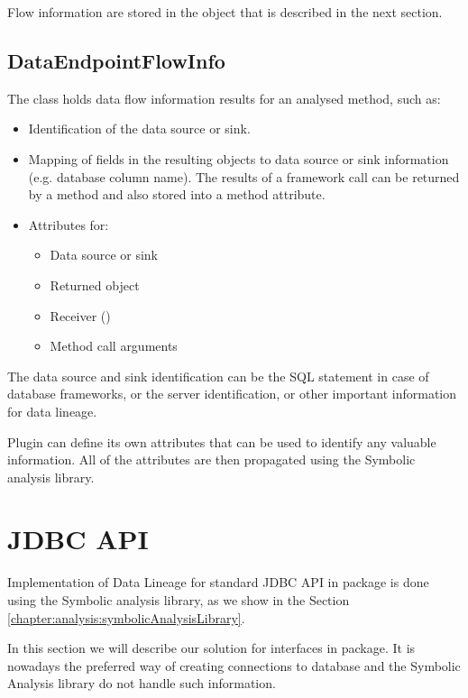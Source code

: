 Flow information are stored in the  object that
is described in the next section.



\subsection{DataEndpointFlowInfo}

The class  holds data flow information results
for an analysed method, such as:
\begin{itemize}
  \item Identification of the data source or sink.
  \item Mapping of fields in the resulting objects to data source or sink information (e.g. database column name).
    The results of a framework call can be returned by a method and also stored into a method attribute.
  \item Attributes for:
    \begin{itemize}
      \item Data source or sink
      \item Returned object
      \item Receiver ()
      \item Method call arguments
    \end{itemize}
\end{itemize}

The data source and sink identification can be the SQL statement in case of database frameworks,
or the server identification, or other important information for data lineage.

Plugin can define its own attributes that can be used to identify any valuable information.
All of the attributes are then propagated using the Symbolic analysis library.




\section{JDBC API \label{implementation:jdbc}}

Implementation of Data Lineage for standard JDBC API in  package
is done using the Symbolic analysis library, as we show in the Section \ref{chapter:analysis:symbolicAnalysisLibrary}.

In this section we will describe our solution for  interfaces in  package.
It is nowadays the preferred way of creating connections to database and the Symbolic Analysis
library do not handle such information.



